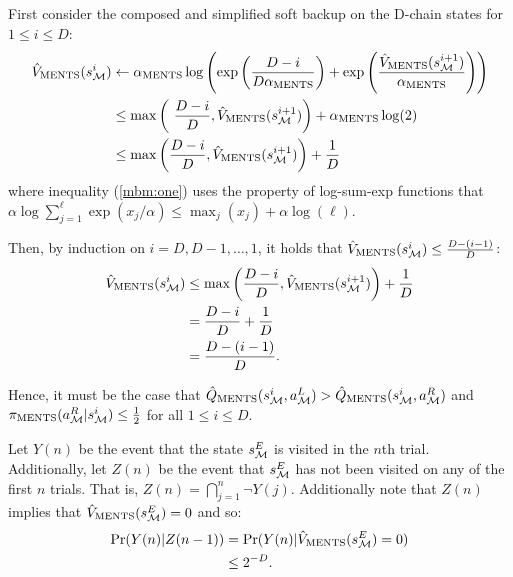\begin{proofoutline}
        First consider the composed and simplified soft backup on the D-chain states for $1\leq i\leq D$:
        \begin{align}
            \Vments(\schain{i}) 
                &\leftarrow \alphaments \log\left(
                        \exp\left( \frac{D-i}{D\alphaments} \right)
                        + \exp\left(\frac{\Vments(\schain{i+1})}{\alphaments} \right)
                        \right) \\
            & \leq \max\left( 
                \frac{D-i}{D},\Vments(\schain{i+1})\right) 
                    + \alphaments\log(2) \label{mbm:one} \\
            & \leq \max\left(
                \frac{D-i}{D},\Vments(\schain{i+1})\right) + \frac{1}{D}
        \end{align} %
        where inequality (\ref{mbm:one}) uses the property of log-sum-exp functions that $\alpha \log \sum_{j=1}^\ell \exp (x_j/\alpha) \leq \max_j (x_j) + \alpha \log(\ell)$.
        
        Then, by induction on $i=D, D-1, \ldots, 1$, it holds that ${\hat{V}_{{\textnormal{MENTS}}}}(s^{i}_{\mathcal{M}})\leq \frac{D-(i-1)}{D}$:
        \begin{align}
            {\hat{V}_{{\textnormal{MENTS}}}}(s^{i}_{\mathcal{M}}) 
                &\leq \max\left(
                    \frac{D-i}{D},{\hat{V}_{{\textnormal{MENTS}}}}(s^{i+1}_{\mathcal{M}})\right) + \frac{1}{D} \\
                &= \frac{D-i}{D} + \frac{1}{D} \\
                &= \frac{D-(i-1)}{D}.
        \end{align}

        Hence, it must be the case that ${\hat{Q}_{{\textnormal{MENTS}}}}(s^{i}_{\mathcal{M}},a^L_{\mathcal{M}}) > {\hat{Q}_{{\textnormal{MENTS}}}}(s^{i}_{\mathcal{M}},a^R_{\mathcal{M}})$ and ${\pi_{{\textnormal{MENTS}}}}(a^R_{\mathcal{M}}|s^{i}_{\mathcal{M}}) \leq \frac{1}{2}$ for all $1\leq i\leq D$.
        
        Let $Y(n)$ be the event that the state $s^{E}_{\mathcal{M}}$ is visited in the $n$th trial. Additionally, let $Z(n)$ be the event that $s^{E}_{\mathcal{M}}$ has not been visited on any of the first $n$ trials. That is, $Z(n)=\bigcap_{j=1}^n \neg Y(j)$. Additionally note that $Z(n)$ implies that ${\hat{V}_{{\textnormal{MENTS}}}}(s^{E}_{\mathcal{M}}) = 0$ and so:
        \begin{align}
            \Pr(Y(n) | Z(n-1)) 
                &= \Pr(Y(n) | {\hat{V}_{{\textnormal{MENTS}}}}(s^{E}_{\mathcal{M}}) = 0)  \\
                &\leq 2^{-D}.
        \end{align}


\end{proofoutline}
